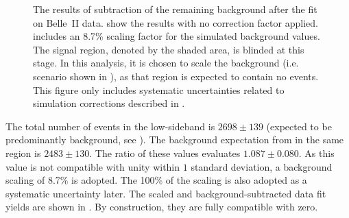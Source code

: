 \begin{figure}[htbp!]
    \centering
    \caption{\label{fig:sidebands_subtracted_figures} The results of subtraction of the remaining \BB background after the fit on Belle~II data.
     show the results with no correction factor applied.
     includes an 8.7\% scaling factor for the simulated background values.
    The signal region, denoted by the shaded area, is blinded at this stage.
    In this analysis, it is chosen to scale the background (i.e. scenario shown in ),
    as that region is expected to contain no \BtoXsgamma events.
    This figure only includes systematic uncertainties related to simulation corrections described in .
    }
\end{figure}

The total number of events in the low-\EB sideband is $2698\pm139$ (expected to be predominantly background, see ).
The background expectation from \MC in the same region is $2483\pm130$.
The ratio of these values evaluates $1.087\pm0.080$.
As this value is not compatible with unity within $1$ standard deviation, a background scaling of 8.7\% is adopted.
The 100\% of the scaling is also adopted as a systematic uncertainty later.
The scaled and background-subtracted data fit yields are shown in .
By construction, they are fully compatible with zero.

